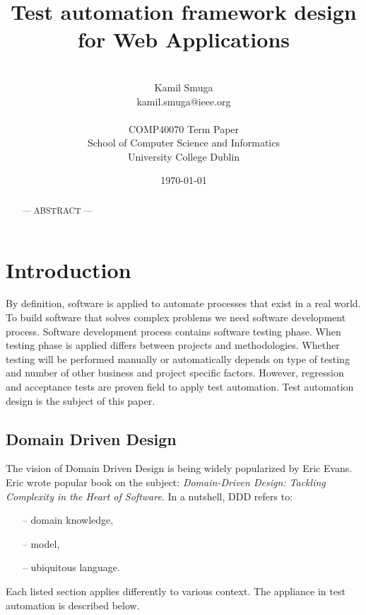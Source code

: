 \documentclass[12pt,twoside]{article}
\begin{document}
\title{Test automation framework design for Web Applications \\} 
\author{\\ Kamil Smuga\\
\small kamil.smuga@ieee.org\\ \\
\small COMP40070 Term Paper\\
\small School of Computer Science and Informatics\\
\small University College Dublin \date{\small\today} } 
\maketitle

\pagestyle{myheadings}
\thispagestyle{empty}

\begin{abstract}
\noindent

--- ABSTRACT --- \\ 
\end{abstract}

\section{Introduction}
 By definition, software is applied to automate processes that exist in a real world. To build software that solves complex problems we need software development process. Software development process contains software testing phase. When testing phase is applied differs between projects and methodologies. Whether testing will be performed manually or automatically depends on type of testing and number of other business and project specific factors. However, regression and acceptance tests are proven field to apply test automation. Test automation design is the subject of this paper.

\subsection{Domain Driven Design}
The vision of Domain Driven Design is being widely popularized by Eric Evans. Eric wrote popular book on the subject: \emph{Domain-Driven Design: Tackling Complexity in the Heart of Software}. In a nutshell, DDD refers to:
\begin{itemize}
\item [--] domain knowledge,
\item [--] model,
\item [--] ubiquitous language.
\end{itemize}
Each listed section applies differently to various context. The appliance in test automation is described below.
\end{document}
